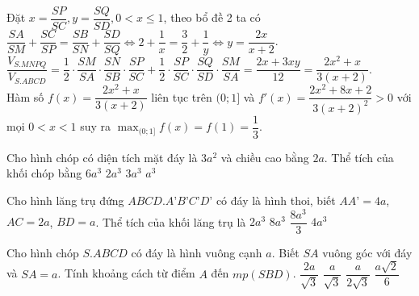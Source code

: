 \begin{ex}
{\begin{center}
\end{center}
Đặt $x= \dfrac{SP}{SC}, y=\dfrac{SQ}{SD}, 0<x \leq 1$, theo bổ đề 2 ta có $\dfrac{SA}{SM} + \dfrac{SC}{SP} = \dfrac{SB}{SN} + \dfrac{SD}{SQ} \Leftrightarrow 2+\dfrac{1}{x} = \dfrac{3}{2} +\dfrac{1}{y} \Leftrightarrow y=\dfrac{2x}{x+2}$. \\
$\dfrac{V_{S.MNPQ}}{V_{S.ABCD}} = \dfrac{1}{2} \cdot \dfrac{SM}{SA} \cdot \dfrac{SN}{SB} \cdot \dfrac{SP}{SC} + \dfrac{1}{2} \cdot \dfrac{SP}{SC} \cdot \dfrac{SQ}{SD} \cdot \dfrac{SM}{SA}=\dfrac{2x+3xy}{12}=\dfrac{2x^2+x}{3(x+2)} $. \\
Hàm số  $f(x) = \dfrac{2x^2+x}{3(x+2)}$ liên tục trên $(0;1]$ và $f'(x) = \dfrac{2x^2+8x+2}{3(x+2)^2} >0$ với mọi $0<x<1$ suy ra $\displaystyle \max_{(0;1]} f(x) = f(1) =\dfrac{1}{3}$. 
}
\end{ex}

\begin{ex}%
Cho hình chóp có diện tích mặt đáy là $3a^2$ và chiều cao bằng $2a$. Thể tích của khối chóp bằng
\choice
{$6a^3$}
{\True $2a^3$}
{$3a^3$}
{$a^3$}
\end{ex}

\begin{ex}%
Cho hình lăng trụ đứng $ABCD.A’B’C’D’$ có đáy là hình thoi, biết $AA’=4a$, $AC=2a$, $BD=a$. Thể tích của khối lăng trụ là
\choice
{$2a^3$}
{$8a^3$}
{$\dfrac{8a^3}{3}$}
{\True $4a^3$}
\end{ex}

\begin{ex}%
Cho hình chóp $S.ABCD$ có đáy là hình vuông cạnh $a$. Biết $SA$ vuông góc với đáy và $SA =a$. Tính khoảng cách từ điểm $A$ đến $mp(SBD)$.
\choice
{$\dfrac{2a}{\sqrt{3}}$}
{\True $\dfrac{a}{\sqrt{3}}$}
{$\dfrac{a}{2\sqrt{3}}$}
{$\dfrac{a\sqrt{2}}{6}$}
\end{ex}

